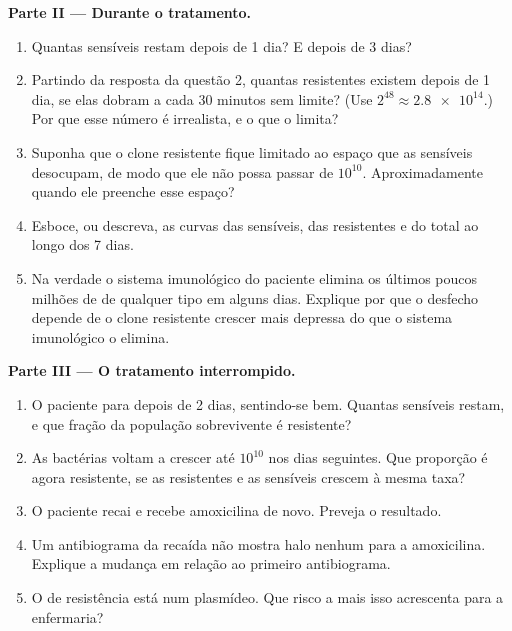 \begin{problem}
\medskip
\noindent\textbf{Parte II --- Durante o tratamento.}
\begin{enumerate}[resume]
  \item Quantas  sensíveis restam depois de 1 dia? E depois de
        3 dias?
  \item Partindo da resposta da questão 2, quantas  resistentes
        existem depois de 1 dia, se elas dobram a cada 30 minutos sem
        limite? (Use $2^{48} \approx \num{2.8e14}$.) Por que esse
        número é irrealista, e o que o limita?
  \item Suponha que o clone resistente fique limitado ao espaço que as
         sensíveis desocupam, de modo que ele não possa passar
        de $10^{10}$. Aproximadamente quando ele preenche esse espaço?
  \item Esboce, ou descreva, as curvas das  sensíveis, das
        resistentes e do total ao longo dos 7 dias.
  \item Na verdade o sistema imunológico do paciente elimina os
        últimos poucos milhões de  de qualquer tipo em alguns
        dias. Explique por que o desfecho depende de o clone resistente
        crescer mais depressa do que o sistema imunológico o elimina.
\end{enumerate}

\medskip
\noindent\textbf{Parte III --- O tratamento interrompido.}
\begin{enumerate}[resume]
  \item O paciente para depois de 2 dias, sentindo-se bem. Quantas
         sensíveis restam, e que fração da população
        sobrevivente é resistente?
  \item As bactérias voltam a crescer até $10^{10}$ nos dias
        seguintes. Que proporção é agora resistente, se as 
        resistentes e as sensíveis crescem à mesma taxa?
  \item O paciente recai e recebe amoxicilina de novo. Preveja o
        resultado.
  \item Um antibiograma da recaída não mostra halo nenhum para a
        amoxicilina. Explique a mudança em relação ao primeiro
        antibiograma.
  \item O  de resistência está num plasmídeo. Que risco a mais
        isso acrescenta para a enfermaria?
\end{enumerate}


\end{problem}
